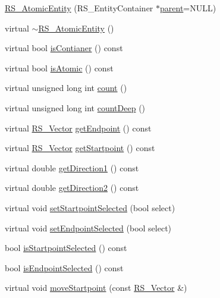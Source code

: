 \begin{DoxyCompactItemize}
\item 
\hyperlink{class_r_s___atomic_entity_abaf0dc8a9de97897ad33fad955101e74}{R\-S\-\_\-\-Atomic\-Entity} (R\-S\-\_\-\-Entity\-Container $\ast$\hyperlink{class_r_s___entity_a80358a8d2fc6739a516a278dc500b49f}{parent}=N\-U\-L\-L)
\item 
virtual \hyperlink{class_r_s___atomic_entity_a78ca30fac2c4a595f4165b90f5ee84b1}{$\sim$\-R\-S\-\_\-\-Atomic\-Entity} ()
\item 
virtual bool \hyperlink{class_r_s___atomic_entity_ab24c1b48be676704c8bed2d8511afd76}{is\-Contianer} () const 
\item 
virtual bool \hyperlink{class_r_s___atomic_entity_a6cdc2a83438fb51b13fec598f73da6a3}{is\-Atomic} () const 
\item 
virtual unsigned long int \hyperlink{class_r_s___atomic_entity_aa5ef736f07da84743b869a80efb8ad51}{count} ()
\item 
virtual unsigned long int \hyperlink{class_r_s___atomic_entity_a71f57de7f225e92a51bbbd0212a0722d}{count\-Deep} ()
\item 
virtual \hyperlink{class_r_s___vector}{R\-S\-\_\-\-Vector} \hyperlink{class_r_s___atomic_entity_a7c65ecfa3124659ad667ea20d7e42607}{get\-Endpoint} () const 
\item 
virtual \hyperlink{class_r_s___vector}{R\-S\-\_\-\-Vector} \hyperlink{class_r_s___atomic_entity_a5e2f2744b91283e110b98e1359c006cf}{get\-Startpoint} () const 
\item 
virtual double \hyperlink{class_r_s___atomic_entity_af830be013d3492aab78525660e2721e8}{get\-Direction1} () const 
\item 
virtual double \hyperlink{class_r_s___atomic_entity_a4b83b0f0d31b35914f2e86a67cac3a6c}{get\-Direction2} () const 
\item 
virtual void \hyperlink{class_r_s___atomic_entity_a3de4b75e6f1eb4bf419c3535db682654}{set\-Startpoint\-Selected} (bool select)
\item 
virtual void \hyperlink{class_r_s___atomic_entity_aca8cf2ec2643782c68cc9700417fec31}{set\-Endpoint\-Selected} (bool select)
\item 
bool \hyperlink{class_r_s___atomic_entity_a473df8be63625c778525c1f368adbeb0}{is\-Startpoint\-Selected} () const 
\item 
bool \hyperlink{class_r_s___atomic_entity_a444007e91f942f6ae174744b67294b01}{is\-Endpoint\-Selected} () const 
\item 
virtual void \hyperlink{class_r_s___atomic_entity_ae09eb376e84a70a3bcf2367ed9397cca}{move\-Startpoint} (const \hyperlink{class_r_s___vector}{R\-S\-\_\-\-Vector} \&)

\end{DoxyCompactItemize}
